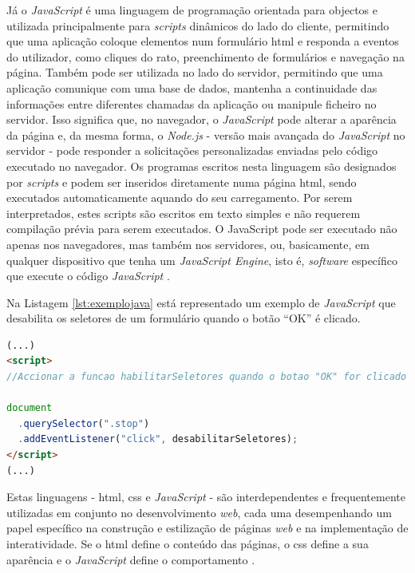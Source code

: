 Já o \textit{JavaScript} é uma linguagem de programação orientada para objectos e utilizada principalmente para \textit{scripts} dinâmicos do lado do cliente, permitindo que uma aplicação coloque elementos num formulário \acrshort{html} e responda a eventos do utilizador, como cliques do rato, preenchimento de formulários e navegação na página. Também pode ser utilizada no lado do servidor, permitindo que uma aplicação comunique com uma base de dados, mantenha a continuidade das informações entre diferentes chamadas da aplicação ou manipule ficheiro no servidor. Isso significa que, no navegador, o \textit{JavaScript} pode alterar a aparência da página e, da mesma forma, o \textit{Node.js} - versão mais avançada do \textit{JavaScript} no servidor - pode responder a solicitações personalizadas enviadas pelo código executado no navegador.  Os programas escritos nesta linguagem são designados por \textit{scripts} e podem ser inseridos diretamente numa página \acrshort{html}, sendo executados automaticamente aquando do seu carregamento. Por serem interpretados, estes scripts são escritos em texto simples e não requerem compilação prévia para serem executados. O JavaScript pode ser executado não apenas nos navegadores, mas também nos servidores, ou, basicamente, em qualquer dispositivo que tenha um \textit{JavaScript Engine}, isto é, \textit{software} específico que execute o código \textit{JavaScript} \cite{JavaScriptRef}.

Na Listagem \ref{lst:exemplojava} está representado um exemplo de \textit{JavaScript} que desabilita os seletores de um formulário quando o botão ``OK'' é clicado.

\begin{minipage}{0.9\linewidth}
    \begin{lstlisting}[language=HTML, caption=Exemplo de \textit{JavaScript}, label=lst:exemplojava]
(...)
<script>
//Accionar a funcao habilitarSeletores quando o botao "OK" for clicado

document
  .querySelector(".stop")
  .addEventListener("click", desabilitarSeletores);
</script>
(...)
	\end{lstlisting}
\end{minipage}

Estas linguagens - \acrshort{html}, \acrshort{css} e \textit{JavaScript} - são interdependentes e frequentemente utilizadas em conjunto no desenvolvimento \textit{web}, cada uma desempenhando um papel específico na construção e estilização de páginas \textit{web} e na implementação de interatividade. Se o \acrshort{html} define o conteúdo das páginas, o \acrshort{css} define a sua aparência e o \textit{JavaScript} define o comportamento \cite{JavaScript}.


